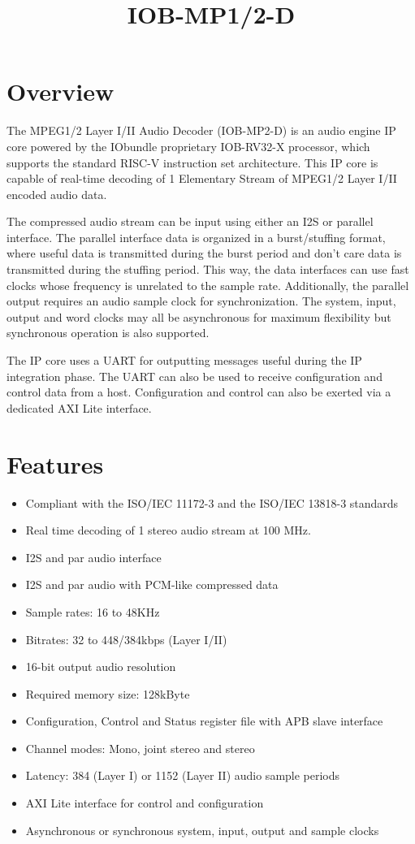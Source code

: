 \documentclass[twocolumn]{iob_pb}
\title{IOB-MP1/2-D}
\newcommand\BackgroundPic{%
\put(0,0){%
\parbox[b][\paperheight]{\paperwidth}{%
\vfill
\centering
\texttt{[image: bg.pdf]}%
\vfill
}}}
\begin{document}
\AddToShipoutPicture*{\BackgroundPic}

\section*{\textcolor[rgb]{0,0,0}{Overview}}

The MPEG1/2 Layer I/II Audio Decoder (IOB-MP2-D) is an audio engine IP core
powered by the IObundle proprietary IOB-RV32-X processor, which supports the
standard RISC-V instruction set architecture. This IP core is capable of
real-time decoding of 1 Elementary Stream of MPEG1/2 Layer I/II encoded audio
data.

The compressed audio stream can be input using either an I2S or parallel
interface. The parallel interface data is organized in a burst/stuffing format,
where useful data is transmitted during the burst period and don't care data is
transmitted during the stuffing period. This way, the data interfaces can use
fast clocks whose frequency is unrelated to the sample rate. Additionally, the
parallel output requires an audio sample clock for synchronization. The system,
input, output and word clocks may all be asynchronous for maximum flexibility
but synchronous operation is also supported.

The IP core uses a UART for outputting messages useful during the IP integration
phase. The UART can also be used to receive configuration and control data from
a host. Configuration and control can also be exerted via a dedicated AXI Lite
interface.

\section*{\textcolor[rgb]{0,0,0}{Features}}
\begin{itemize}
\item Compliant with the ISO/IEC 11172-3 and the ISO/IEC 13818-3 standards
\item Real time decoding of 1 stereo audio stream at 100 MHz.
\item I2S and par audio interface
\item I2S and par audio with PCM-like compressed data
\item Sample rates: 16 to 48KHz
\item Bitrates: 32 to 448/384kbps (Layer I/II)
\item 16-bit output audio resolution
\item Required memory size: 128kByte
\item Configuration, Control and Status register file with APB slave interface
\item Channel modes: Mono, joint stereo and stereo
\item Latency: 384 (Layer I) or 1152 (Layer II) audio sample periods
\item AXI Lite interface for control and configuration
\item Asynchronous or synchronous system, input, output and sample clocks
\end{itemize}
\end{document}
